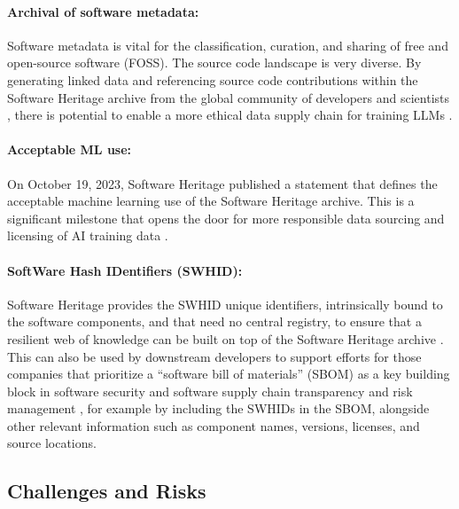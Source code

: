 \documentclass[10pt]{article} %
\begin{document}
\paragraph{Archival of software metadata:} Software metadata is vital for the classification, curation, and sharing of free and open-source software (FOSS). The source code landscape is very diverse. By generating linked data and referencing source code contributions within the Software Heritage archive from the global community of developers and scientists \citep{softwareheritage2024community}, there is potential to enable a more ethical data supply chain for training LLMs \citep{dicosmo:hal-01590958, cacm-2018-software-heritage}.

\paragraph{Acceptable ML use:} On October 19, 2023, Software Heritage published a statement that defines the acceptable machine learning use of the Software Heritage archive. This is a significant milestone that opens the door for more responsible data sourcing and licensing of AI training data \citep{softwareheritage2023swhstatement}.

\paragraph{SoftWare Hash IDentifiers (SWHID):} Software Heritage provides the SWHID unique identifiers, intrinsically bound to the software components, and that need no central registry, to ensure that a resilient web of knowledge can be built on top of the Software Heritage archive \citep{swhidspecification2024}. This can also be used by downstream developers to support efforts for those companies that prioritize a “software bill of materials” (SBOM) as a key building block in software security and software supply chain transparency and risk management \citep{cisa2024securebydesign, mirakhorli2024landscape}, for example by including the SWHIDs in the SBOM, alongside other relevant information such as component names, versions, licenses, and source locations.

\subsection{Challenges and Risks}
\end{document}
